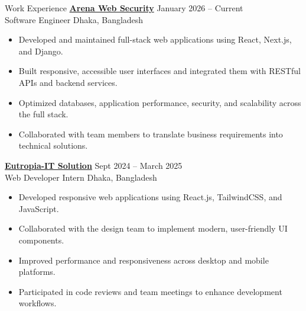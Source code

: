 \documentclass{resume} %
\begin{document}
{\fontsize{11pt}{13pt}\selectfont

\vspace{-0.15cm}
\vspace{-0.18cm}
\vspace{-0.18cm}

\begin{rSection}{Work Experience}
    {\href{https://www.arenawebsecurity.net/}{\bf Arena Web Security}} \hfill {January 2026 -- Current} \\
    {Software Engineer} \hfill {Dhaka, Bangladesh}
    \begin{itemize}[leftmargin=0.4cm, label={\Large \textbullet}]
    \justifying
    \setlength\itemsep{-0.15cm}
    \vspace{-0.2cm}
        \item Developed and maintained full-stack web applications using React, Next.js, and Django.
        \item Built responsive, accessible user interfaces and integrated them with RESTful APIs and backend services.
        \item Optimized databases, application performance, security, and scalability across the full stack.
        \item Collaborated with team members to translate business requirements into technical solutions.
    \end{itemize}

    {\href{https://eutropia-it.com/}{\bf Eutropia-IT Solution}} \hfill {Sept 2024 -- March 2025} \\
    {Web Developer Intern} \hfill {Dhaka, Bangladesh}
    \begin{itemize}[leftmargin=0.4cm, label={\Large \textbullet}]
    \justifying
    \setlength\itemsep{-0.15cm}
    \vspace{-0.2cm}
        \item Developed responsive web applications using React.js, TailwindCSS, and JavaScript.
        \item Collaborated with the design team to implement modern, user-friendly UI components.
        \item Improved performance and responsiveness across desktop and mobile platforms.
        \item Participated in code reviews and team meetings to enhance development workflows.
    \end{itemize}
\end{rSection}
\vspace{-0.18cm}

}
\end{document}
